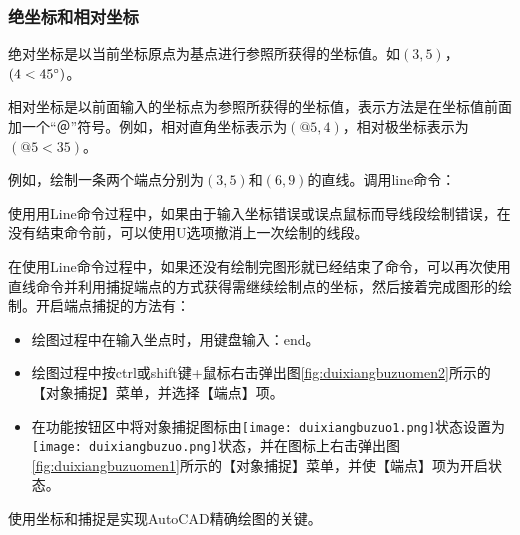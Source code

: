 \subsubsection{绝坐标和相对坐标}
绝对坐标是以当前坐标原点为基点进行参照所获得的坐标值。如$(3,5)$，$(4<45\degree)$。

相对坐标是以前面输入的坐标点为参照所获得的坐标值，表示方法是在坐标值前面加一个“＠”符号。例如，相对直角坐标表示为$(@5,4)$，相对极坐标表示为$(@5<35)$。

例如，绘制一条两个端点分别为$(3,5)$和$(6,9)$的直线。调用line命令：

\noindent



\begin{tips}
\item 使用用Line命令过程中，如果由于输入坐标错误或误点鼠标而导线段绘制错误，在没有结束命令前，可以使用U选项撤消上一次绘制的线段。
\item 在使用Line命令过程中，如果还没有绘制完图形就已经结束了命令，可以再次使用直线命令并利用捕捉端点的方式获得需继续绘制点的坐标，然后接着完成图形的绘制。开启端点捕捉的方法有：
\begin{itemize}
\item 绘图过程中在输入坐点时，用键盘输入：end。
\item 绘图过程中按ctrl或shift键+鼠标右击弹出图\ref{fig:duixiangbuzuomen2}所示的【对象捕捉】菜单，并选择【端点】项。
\item 在功能按钮区中将对象捕捉图标由\texttt{[image: duixiangbuzuo1.png]}状态设置为\texttt{[image: duixiangbuzuo.png]}状态，并在图标上右击弹出图\ref{fig:duixiangbuzuomen1}所示的【对象捕捉】菜单，并使【端点】项为开启状态。
\end{itemize}
\item 使用坐标和捕捉是实现AutoCAD精确绘图的关键。
\end{tips}
\begin{figure}[htbp]
\centering
\begin{floatrow}
\end{floatrow}
\end{figure}

